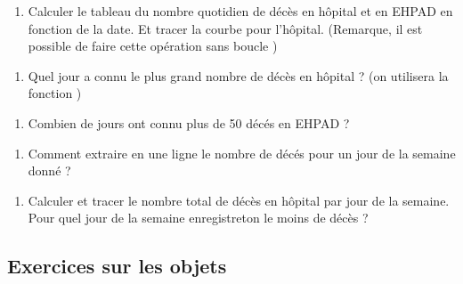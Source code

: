 \documentclass[letterpaper,10pt,english]{sphinxhowto}
\begin{document}
\begin{enumerate}
%
\setcounter{enumi}{5}
\item {} 
\sphinxAtStartPar
Calculer le tableau du nombre quotidien de décès en hôpital et en EHPAD en fonction de la date. Et tracer la courbe pour l’hôpital. (Remarque, il est possible de faire cette opération sans boucle )

\end{enumerate}
\begin{enumerate}
%
\setcounter{enumi}{6}
\item {} 
\sphinxAtStartPar
Quel jour a connu le plus grand nombre de décès en hôpital ? (on utilisera la fonction )

\end{enumerate}
\begin{enumerate}
%
\setcounter{enumi}{7}
\item {} 
\sphinxAtStartPar
Combien de jours ont connu plus de 50 décés en EHPAD ?

\end{enumerate}
\begin{enumerate}
%
\setcounter{enumi}{8}
\item {} 
\sphinxAtStartPar
Comment extraire en une ligne le nombre de décés pour un jour de la semaine donné ?

\end{enumerate}
\begin{enumerate}
%
\setcounter{enumi}{9}
\item {} 
\sphinxAtStartPar
Calculer et tracer le nombre total de décès en hôpital par jour de la semaine. Pour quel jour de la semaine enregistre\sphinxhyphen{}t\sphinxhyphen{}on le moins de décès ?

\end{enumerate}


\subsection{Exercices sur les objets}
\label{\detokenize{exercices_geographie:exercices-sur-les-objets}}\label{\detokenize{exercices_geographie::doc}}
\end{document}

